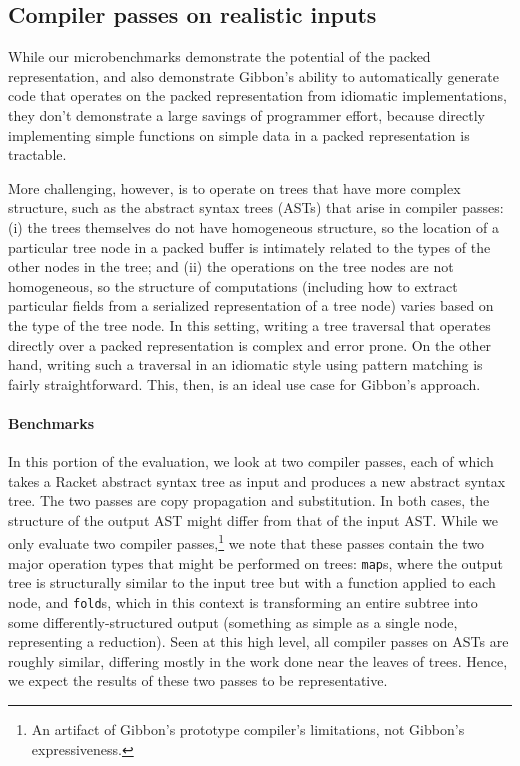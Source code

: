 \documentclass[a4paper,english]{lipics-v2016}
\newcommand{\treelang}{Gibbon\xspace} %
\begin{document}
\subsection{Compiler passes on realistic inputs} \label{sec:astbench}

While our microbenchmarks demonstrate the potential of the packed
representation, and also demonstrate \treelang{}'s ability to automatically
generate code that operates on the packed representation from idiomatic
implementations, they don't demonstrate a large savings of programmer effort,
because directly implementing simple functions on simple data in a packed
representation is tractable.

More challenging, however, is to operate on trees that have more complex
structure, such as the abstract syntax trees (ASTs) that arise in compiler
passes: (i) the trees themselves do not have homogeneous structure, so the
location of a particular tree node in a packed buffer is intimately related to
the types of the other nodes in the tree; and (ii) the operations on the tree
nodes are not homogeneous, so the structure of computations (including how to
extract particular fields from a serialized representation of a tree node)
varies based on the type of the tree node. In this setting, writing a tree
traversal that operates directly over a packed representation is complex and
error prone. On the other hand, writing such a traversal in an idiomatic style
using pattern matching is fairly straightforward. This, then, is an ideal use
case for \treelang{}'s approach.

\paragraph*{Benchmarks}
In this portion of the evaluation, we look at two compiler passes, each of
which takes a Racket abstract syntax tree as input and produces a new abstract
syntax tree. The two passes are copy propagation and substitution. In both
cases, the structure of the output AST might differ from that of the input
AST. While we only evaluate two compiler passes,\footnote{An artifact of \treelang{}'s prototype compiler's limitations, not \treelang{}'s expressiveness.} we note that these passes contain the two major operation types that might be performed on trees: {\tt map}s, where the output tree is structurally similar to the input tree but with a function applied to each node, and {\tt fold}s, which in this context is transforming an entire subtree into some differently-structured output (something as simple as a single node, representing a reduction). Seen at this high level, all compiler passes on ASTs are roughly similar, differing mostly in the work done near the leaves of trees. Hence, we expect the results of these two passes to be representative.
\end{document}
